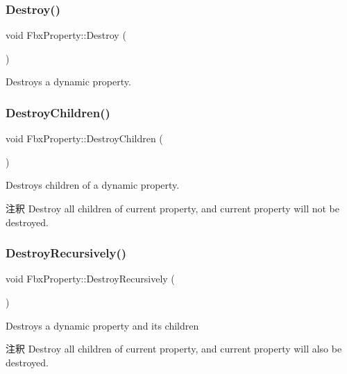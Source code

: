 \subsubsection{\texorpdfstring{Destroy()}{Destroy()}}
{\footnotesize\ttfamily void Fbx\+Property\+::\+Destroy (\begin{DoxyParamCaption}{ }\end{DoxyParamCaption})}

Destroys a dynamic property. \mbox{\label{class_fbx_property_a5dbf74ee7ac5ec07d810d24d58c50ead}} 
\subsubsection{\texorpdfstring{Destroy\+Children()}{DestroyChildren()}}
{\footnotesize\ttfamily void Fbx\+Property\+::\+Destroy\+Children (\begin{DoxyParamCaption}{ }\end{DoxyParamCaption})}

Destroys children of a dynamic property. \begin{DoxyRemark}{注釈}
Destroy all children of current property, and current property will not be destroyed. 
\end{DoxyRemark}
\mbox{\label{class_fbx_property_acd55a5da5402c12716b5dcda32068456}} 
\subsubsection{\texorpdfstring{Destroy\+Recursively()}{DestroyRecursively()}}
{\footnotesize\ttfamily void Fbx\+Property\+::\+Destroy\+Recursively (\begin{DoxyParamCaption}{ }\end{DoxyParamCaption})}

Destroys a dynamic property and its children \begin{DoxyRemark}{注釈}
Destroy all children of current property, and current property will also be destroyed. 
\end{DoxyRemark}
\mbox{\label{class_fbx_property_ad4205b37ed636ff110565351d82a6468}} 

